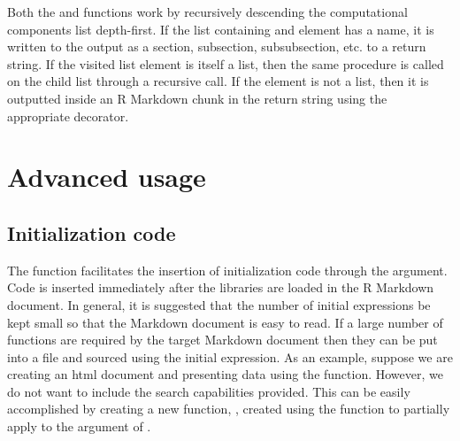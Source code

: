 \documentclass[
]{jss}
\begin{document}
Both the  and  functions
work by recursively descending the computational components list
depth-first. If the list containing and element has a name, it is
written to the output as a section, subsection, subsubsection, etc. to a
return string. If the visited list element is itself a list, then the
same procedure is called on the child list through a recursive call. If
the element is not a list, then it is outputted inside an R Markdown
chunk in the return string using the appropriate decorator.

\hypertarget{advanced-usage}{%
\section{Advanced usage}\label{advanced-usage}}

\hypertarget{initialization-code}{%
\subsection{Initialization code}\label{initialization-code}}

The  function facilitates the insertion of
initialization code through the  argument. Code is
inserted immediately after the libraries are loaded in the R Markdown
document. In general, it is suggested that the number of initial
expressions be kept small so that the  Markdown document is
easy to read. If a large number of functions are required by the target
 Markdown document then they can be put into a file and
sourced using the initial expression. As an example, suppose we are
creating an html document and presenting data using the
 function. However, we do not want to include the
search capabilities provided. This can be easily accomplished by
creating a new function, , created using the
 function \cite{purrr} to partially apply
 to the  argument of
.
\end{document}
